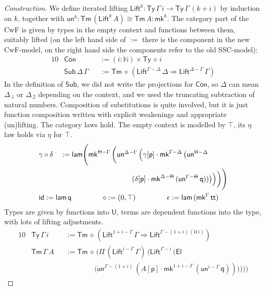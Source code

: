 \documentclass[sigplan,10pt,anonymous,review]{acmart}\settopmatter{printfolios=true,printccs=false,printacmref=false}
\newcommand{\ra}{\rightarrow}
\newcommand{\Ra}{\Rightarrow}
\newcommand{\Ty}{\mathsf{Ty}}
\newcommand{\Tm}{\mathsf{Tm}}
\newcommand{\Con}{\mathsf{Con}}
\newcommand{\Sub}{\mathsf{Sub}}
\newcommand{\p}{\mathsf{p}}
\newcommand{\q}{\mathsf{q}}
\newcommand{\N}{\mathbb{N}}
\newcommand{\lam}{\mathsf{lam}}
\newcommand{\U}{\mathsf{U}}
\newcommand{\El}{\mathsf{El}}
\renewcommand{\tt}{\mathsf{tt}}
\newcommand{\Lift}{\mathsf{Lift}}
\newcommand{\mk}{\mathsf{mk}}
\newcommand{\un}{\mathsf{un}}
\newcommand{\id}{\mathsf{id}}
\begin{document}
\begin{proof}[Construction]
  We define iterated lifting $\Lift^k :
  \Ty\,\Gamma\,i\ra\Ty\,\Gamma\,(k+i)$ by induction on $k$, together
  with $\un^k : \Tm\,(\Lift^k\,A)\cong\Tm\,A : \mk^k$. The category
  part of the CwF is given by types in the empty context and functions
  between them, suitably lifted (on the left hand side of $:=$ there
  is the component in the new CwF-model, on the right hand side the
  components refer to the old SSC-model):
  \begin{alignat*}{10}
    & \Con && := (i:\N)\times\Ty\,\diamond\,i \\
    & \Sub\,\Delta\,\Gamma && := \Tm\,\diamond\,(\Lift^{\Gamma-\Delta}\,\Delta\Ra\Lift^{\Delta-\Gamma}\,\Gamma)
  \end{alignat*}
  In the definition of $\Sub$, we did not write the projections for
  $\Con$, so $\Delta$ can mean $\Delta_{.1}$ or $\Delta_{.2}$
  depending on the context, and we used the truncating subtraction of
  natural numbers. Composition of substitutions is quite involved, but
  it is just function composition written with explicit weakenings and
  appropriate (un)lifting. The category laws hold. The empty context is
  modelled by $\top$, its $\eta$ law holds via $\eta$ for $\top$.
  \begin{alignat*}{10}
    & \gamma\circ\delta && := \lam\Bigg(\mk^{\Theta-\Gamma}\,\bigg(\un^{\Delta-\Gamma}\,\Big(\gamma[\p]\cdot\mk^{\Gamma-\Delta}\,\big(\un^{\Theta-\Delta}\, \\
    & && \hspace{10em}(\delta[\p]\cdot\mk^{\Delta-\Theta}\,(\un^{\Gamma-\Theta}\,\q))\big)\Big)\bigg)\Bigg) \\
    & \rlap{$\id := \lam\,\q \hspace{4.35em} \diamond := (0,\top) \hspace{4.35em} \epsilon := \lam\,(\mk^\Gamma\,\tt)$}
  \end{alignat*}
  Types are given by functions into $\U$, terms are dependent
  functions into the type, with lots of lifting adjustments.
  \begin{alignat*}{10}
    & \Ty\,\Gamma\,i && := \Tm\,\diamond\,(\Lift^{1+i-\Gamma}\,\Gamma\Ra\Lift^{\Gamma-(1+i)\,(\U\,i)}) \\
    & \Tm\,\Gamma\,A && := \Tm\,\diamond\,\Bigg(\Pi\,(\Lift^{i-\Gamma}\,\Gamma)\,\bigg(\Lift^{\Gamma-i}\,\Big(\El\, \\
    & && \hspace{4em} \big(\un^{\Gamma-(1+i)}\,(A[\p]\cdot\mk^{1+i-\Gamma}\,(\un^{i-\Gamma}\,\q))\big)\Big)\bigg)\Bigg)

\end{alignat*}
\end{proof}
\end{document}

